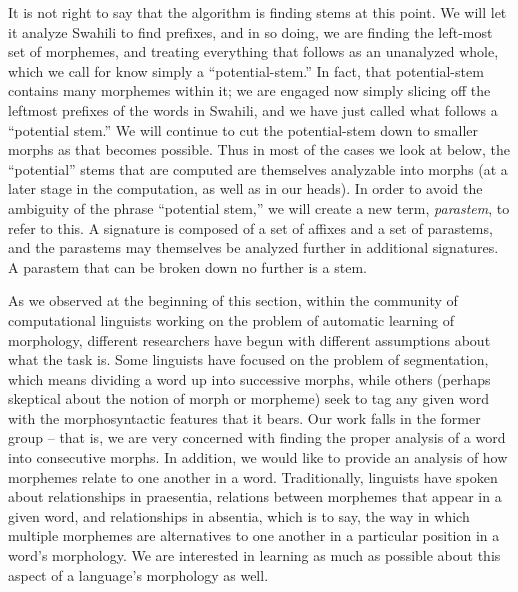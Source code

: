 \documentclass[output=paper,colorlinks,citecolor=brown]{langscibook}
\begin{document}
It is not right to say that the algorithm is finding stems at this point. We will let it analyze Swahili to find prefixes, and in so doing, we are finding the left-most set of morphemes, and treating everything that follows as an unanalyzed whole, which we call for know simply a ``potential-stem.'' In fact, that potential-stem contains many morphemes within it; we are engaged now simply slicing off the leftmost prefixes of the words in Swahili, and we have just called what follows a ``potential stem.''  We will continue to cut the potential-stem down to smaller morphs as that becomes possible. Thus in most of the cases we look at below, the ``potential'' stems that are computed are themselves analyzable into morphs (at a later stage in the computation, as well as in our heads). In order to avoid the ambiguity of the phrase ``potential stem,'' we will create a new term, \textit{parastem}, to refer to this. A signature is composed of a set of affixes and a set of parastems, and the parastems may themselves be analyzed further in additional signatures. A parastem that can be broken down no further is a stem.

As we observed at the beginning of this section, within the community of computational linguists working on the problem of automatic learning of morphology, different researchers have begun with different assumptions about what the task is. Some linguists have focused on the problem of segmentation, which means dividing a word up into successive morphs, while others (perhaps skeptical about the notion of morph or morpheme) seek to tag any given word with the morphosyntactic features that it bears. Our work falls in the former group -- that is, we are very concerned with finding the proper analysis of a word into consecutive morphs. In addition, we would like to provide an analysis of how morphemes relate to one another in a word. Traditionally, linguists have spoken about relationships in praesentia, relations between morphemes that appear in a given word, and relationships in absentia, which is to say, the way in which multiple morphemes are alternatives to one another in a particular position in a word's morphology. We are interested in learning as much as possible about this aspect of a language's morphology as well.
 
\end{document}
